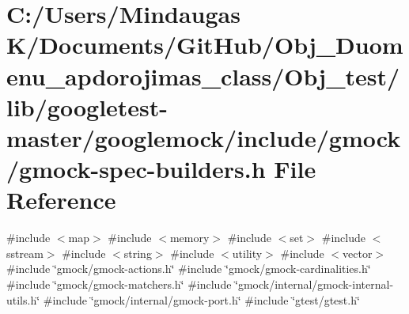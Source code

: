 \hypertarget{_obj__test_2lib_2googletest-master_2googlemock_2include_2gmock_2gmock-spec-builders_8h}{}\section{C\+:/\+Users/\+Mindaugas K/\+Documents/\+Git\+Hub/\+Obj\+\_\+\+Duomenu\+\_\+apdorojimas\+\_\+class/\+Obj\+\_\+test/lib/googletest-\/master/googlemock/include/gmock/gmock-\/spec-\/builders.h File Reference}
\label{_obj__test_2lib_2googletest-master_2googlemock_2include_2gmock_2gmock-spec-builders_8h}
{\ttfamily \#include $<$map$>$}\newline
{\ttfamily \#include $<$memory$>$}\newline
{\ttfamily \#include $<$set$>$}\newline
{\ttfamily \#include $<$sstream$>$}\newline
{\ttfamily \#include $<$string$>$}\newline
{\ttfamily \#include $<$utility$>$}\newline
{\ttfamily \#include $<$vector$>$}\newline
{\ttfamily \#include \char`\"{}gmock/gmock-\/actions.\+h\char`\"{}}\newline
{\ttfamily \#include \char`\"{}gmock/gmock-\/cardinalities.\+h\char`\"{}}\newline
{\ttfamily \#include \char`\"{}gmock/gmock-\/matchers.\+h\char`\"{}}\newline
{\ttfamily \#include \char`\"{}gmock/internal/gmock-\/internal-\/utils.\+h\char`\"{}}\newline
{\ttfamily \#include \char`\"{}gmock/internal/gmock-\/port.\+h\char`\"{}}\newline
{\ttfamily \#include \char`\"{}gtest/gtest.\+h\char`\"{}}\newline
